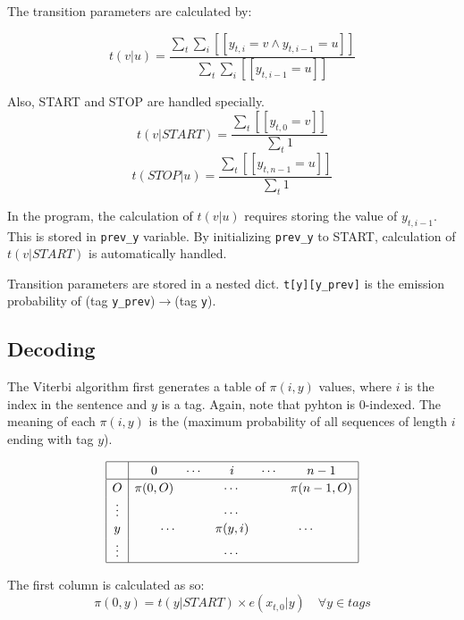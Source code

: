 \documentclass[12pt]{article}
\begin{document}
The transition parameters are calculated by:

\[ t(v|u) = \frac{\sum_t \sum_i [[y_{t,i}=v \land y_{t,i-1}=u]] }{\sum_{t} \sum_i [[y_{t,i-1}=u]] } \]

Also, START and STOP are handled specially.
\[ t(v|START) = \frac{\sum_t [[y_{t,0}=v]] }{\sum_{t} 1 } \]
\[ t(STOP|u) = \frac{\sum_t [[y_{t,n-1}=u]] }{\sum_{t} 1 } \]

In the program, the calculation of \(t(v|u)\) requires storing the value of \(y_{t,i-1}\). This is stored in \verb|prev_y| variable. By initializing \verb|prev_y| to START, calculation of \(t(v|START)\) is automatically handled.

Transition parameters are stored in a nested dict. \verb|t[y][y_prev]| is the emission probability of (tag \verb|y_prev|)\(\rightarrow\)(tag \verb|y|).

\subsection{Decoding}

The Viterbi algorithm first generates a table of \(\pi(i,y)\) values, where \(i\) is the index in the sentence and \(y\) is a tag. Again, note that pyhton is 0-indexed. The meaning of each \(\pi(i,y)\) is the (maximum probability of all sequences of length \(i\) ending with tag \(y\)).

\[
\begin{array}{|c|ccccc|}
\hline \rule{0pt}{1em}
& 0 & \cdots & i & \cdots & n-1 \\
\hline \rule{0pt}{1em}
O      & \pi(0,O) & \multicolumn{3}{c}{\cdots} & \pi(n-1,O) \\[0.1em]
\vdots &          & \multicolumn{3}{c}{\cdots} &            \\[0.1em]
y      & \multicolumn{2}{c}{\cdots} & \pi(y,i) & \multicolumn{2}{c|}{\cdots} \\[0.1em]
\vdots &          & \multicolumn{3}{c}{\cdots} &            \\[0.1em]
\hline
\end{array}
\]

The first column is calculated as so:
\[ \pi(0,y) = t(y|START) \times e(x_{t,0}|y) \quad \forall y \in {tags}\]
\end{document}
